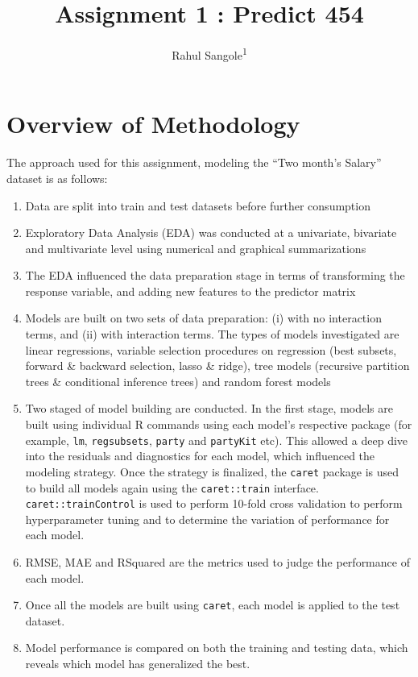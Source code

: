 \documentclass[floatsintext,man]{apa6}
\title{Assignment 1 : Predict 454}
\author{Rahul Sangole\textsuperscript{1}}
\affiliation{
    \vspace{0.5cm}
          \textsuperscript{1} Northwestern University  }
\providecommand{\tightlist}{%
  \setlength{\itemsep}{0pt}\setlength{\parskip}{0pt}}
\theoremstyle{definition}
\theoremstyle{definition}
\theoremstyle{definition}
\theoremstyle{remark}
\begin{document}
\maketitle

\setcounter{secnumdepth}{0}



\section{Overview of Methodology}\label{overview-of-methodology}

The approach used for this assignment, modeling the \enquote{Two month's
Salary} dataset is as follows:

\begin{enumerate}
\def\labelenumi{\arabic{enumi}.}
\tightlist
\item
  Data are split into train and test datasets before further consumption
\item
  Exploratory Data Analysis (EDA) was conducted at a univariate,
  bivariate and multivariate level using numerical and graphical
  summarizations
\item
  The EDA influenced the data preparation stage in terms of transforming
  the response variable, and adding new features to the predictor matrix
\item
  Models are built on two sets of data preparation: (i) with no
  interaction terms, and (ii) with interaction terms. The types of
  models investigated are linear regressions, variable selection
  procedures on regression (best subsets, forward \& backward selection,
  lasso \& ridge), tree models (recursive partition trees \& conditional
  inference trees) and random forest models
\item
  Two staged of model building are conducted. In the first stage, models
  are built using individual R commands using each model's respective
  package (for example, \texttt{lm}, \texttt{regsubsets}, \texttt{party}
  and \texttt{partyKit} etc). This allowed a deep dive into the
  residuals and diagnostics for each model, which influenced the
  modeling strategy. Once the strategy is finalized, the \texttt{caret}
  package is used to build all models again using the
  \texttt{caret::train} interface. \texttt{caret::trainControl} is used
  to perform 10-fold cross validation to perform hyperparameter tuning
  and to determine the variation of performance for each model.
\item
  RMSE, MAE and RSquared are the metrics used to judge the performance
  of each model.
\item
  Once all the models are built using \texttt{caret}, each model is
  applied to the test dataset.
\item
  Model performance is compared on both the training and testing data,
  which reveals which model has generalized the best.
\end{enumerate}
\end{document}
